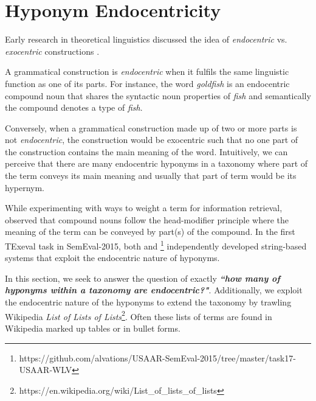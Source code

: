 \section{Hyponym Endocentricity}

Early research in theoretical linguistics discussed the idea of \emph{endocentric} vs. \emph{exocentric} constructions \citep{brugmann1886vergleichende,aleksandrov1886sprachliches,brockelmann1908grundriss,bloomfield1983introduction}. 

A grammatical construction is \emph{endocentric} when it fulfils the same linguistic function as one of its parts. For instance, the word \emph{goldfish} is an endocentric compound noun that shares the syntactic noun properties of \emph{fish} and semantically the compound denotes a type of \emph{fish}. 

Conversely, when a grammatical construction made up of two or more parts is not \emph{endocentric}, the construction would be exocentric such that no one part of the construction contains the main meaning of the word. Intuitively, we can perceive that there are many endocentric hyponyms in a taxonomy where part of the term conveys its main meaning and usually that part of term would be its hypernym.

While experimenting with ways to weight a term for information retrieval, \cite{jones1979experiments} observed that compound nouns follow the head-modifier principle where the meaning of the term can be conveyed by part(s) of the compound. In the first TExeval task in SemEval-2015, both \cite{lefever:2015:SemEval} and \cite{tan-gupta-vangenabith:2015:SemEval}\footnote{https://github.com/alvations/USAAR-SemEval-2015/tree/master/task17-USAAR-WLV} independently developed string-based systems that exploit the endocentric nature of hyponyms. 


In this section, we seek to answer the question of exactly \textbf{\emph{``how many of hyponyms within a taxonomy are endocentric?"}}. Additionally, we exploit the endocentric nature of the hyponyms to extend the taxonomy by trawling Wikipedia \emph{List of Lists of Lists}\footnote{https://en.wikipedia.org/wiki/List\_of\_lists\_of\_lists}. Often these lists of terms are found in Wikipedia marked up tables or in bullet forms.

